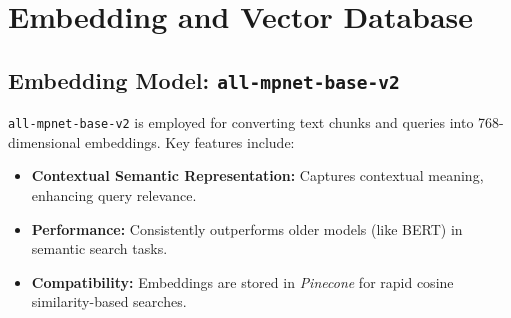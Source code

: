 \section{Embedding and Vector Database}
\label{sec:embedding_vector_db}

\subsection{Embedding Model: \texttt{all-mpnet-base-v2}}
\label{subsec:all_mpnet_base_v2}
\texttt{all-mpnet-base-v2} is employed for converting text chunks and queries into 768-dimensional embeddings. Key features include:
\begin{itemize}[itemsep=2em]
  \item \textbf{Contextual Semantic Representation:} Captures contextual meaning, enhancing query relevance.
  \item \textbf{Performance:} Consistently outperforms older models (like BERT) in semantic search tasks.
  \item \textbf{Compatibility:} Embeddings are stored in \emph{Pinecone} for rapid cosine similarity-based searches.
\end{itemize}

